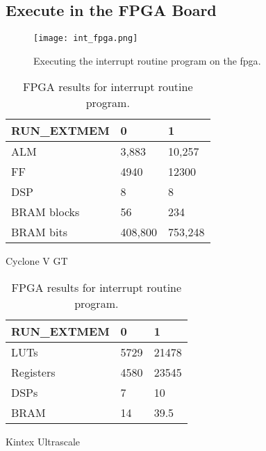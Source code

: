 \subsection{Execute in the FPGA Board}

\begin{figure}[!ht]
    \centering
    \texttt{[image: int\_fpga.png]}
    \caption{Executing the interrupt routine program on the \acrshort{fpga}.}
    \label{fig:int_fpga}
\end{figure}

\begin{table}[h]
    \begin{subtable}[h]{0.45\textwidth}
        \centering
        \begin{tabular}{|l|l|l|}
            \hline
            RUN\_EXTMEM & 0       & 1       \\ \hline
            ALM         & 3,883   & 10,257  \\ \hline
            FF          & 4940    & 12300   \\ \hline
            DSP         & 8       & 8       \\ \hline
            BRAM blocks & 56      & 234     \\ \hline
            BRAM bits   & 408,800 & 753,248 \\ \hline
        \end{tabular}
       \caption{Cyclone V GT}
       \label{tab:cyclone_int}
    \end{subtable}
    \hfill
    \begin{subtable}[h]{0.45\textwidth}
        \centering
        \begin{tabular}{|l|l|l|}
            \hline
            RUN\_EXTMEM & 0    & 1     \\ \hline
            LUTs        & 5729 & 21478 \\ \hline
            Registers   & 4580 & 23545 \\ \hline
            DSPs        & 7    & 10    \\ \hline
            BRAM        & 14   & 39.5  \\ \hline
        \end{tabular}
        \caption{Kintex Ultrascale}
        \label{tab:kintex_int}
     \end{subtable}
     \caption{FPGA results for interrupt routine program.}
     \label{tab:fpga_int}
\end{table}


